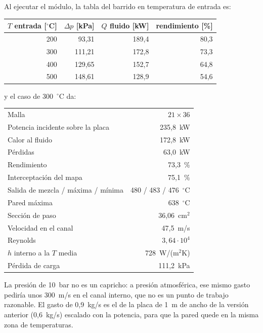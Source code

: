 \documentclass[11pt,a4paper]{article}
\begin{document}
Al ejecutar el módulo, la tabla del barrido en temperatura de entrada es:

\begin{center}
\begin{tabular}{rrrr}
  \toprule
  $T$ entrada [$^\circ$C] & $\Delta p$ [kPa] & $Q$ fluido [kW] & rendimiento [\%] \\
  \midrule
  200 &  93,31 & 189,4 & 80,3 \\
  300 & 111,21 & 172,8 & 73,3 \\
  400 & 129,65 & 152,7 & 64,8 \\
  500 & 148,61 & 128,9 & 54,6 \\
  \bottomrule
\end{tabular}
\end{center}

y el caso de 300~$^\circ$C da:

\begin{center}
\begin{tabular}{lr}
  \toprule
  Malla                               & $21\times36$ \\
  Potencia incidente sobre la placa   & 235,8~kW \\
  Calor al fluido                     & 172,8~kW \\
  Pérdidas                            & 63,0~kW \\
  Rendimiento                         & 73,3~\% \\
  Interceptación del mapa             & 75,1~\% \\
  Salida de mezcla / máxima / mínima  & 480 / 483 / 476~$^\circ$C \\
  Pared máxima                        & 638~$^\circ$C \\
  Sección de paso                     & 36,06~cm$^2$ \\
  Velocidad en el canal               & 47,5~m/s \\
  Reynolds                            & $3{,}64\cdot10^{4}$ \\
  $h$ interno a la $T$ media          & 728~W/(m$^2$K) \\
  Pérdida de carga                    & 111,2~kPa \\
  \bottomrule
\end{tabular}
\end{center}

La presión de 10~bar no es un capricho: a presión atmosférica, ese mismo gasto
pediría unos 300~m/s en el canal interno, que no es un punto de trabajo
razonable. El gasto de 0,9~kg/s es el de la placa de 1~m de ancho de la versión
anterior (0,6~kg/s) escalado con la potencia, para que la pared quede en la
misma zona de temperaturas.
\end{document}
